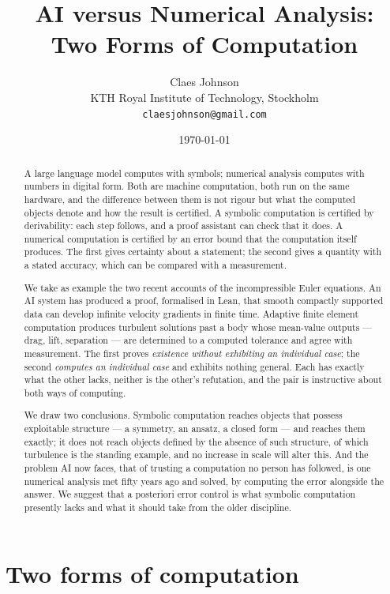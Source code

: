 \documentclass[11pt]{article}
\title{\vspace{-2em}AI versus Numerical Analysis:\\Two Forms of Computation}
\author{Claes Johnson\\[0.2em]
\small KTH Royal Institute of Technology, Stockholm\\
\small \texttt{claesjohnson@gmail.com}}
\date{\today}
\begin{document}
\maketitle

\begin{abstract}
\noindent
A large language model computes with symbols; numerical analysis computes with numbers in digital
form. Both are machine computation, both run on the same hardware, and the difference between them
is not rigour but what the computed objects denote and how the result is certified. A symbolic
computation is certified by derivability: each step follows, and a proof assistant can check that it
does. A numerical computation is certified by an error bound that the computation itself produces.
The first gives certainty about a statement; the second gives a quantity with a stated accuracy,
which can be compared with a measurement.

We take as example the two recent accounts of the incompressible Euler equations. An AI system has
produced a proof, formalised in Lean, that smooth compactly supported data can develop infinite
velocity gradients in finite time. Adaptive finite element computation produces turbulent solutions
past a body whose mean-value outputs --- drag, lift, separation --- are determined to a computed
tolerance and agree with measurement. The first proves \emph{existence without exhibiting an
individual case}; the second \emph{computes an individual case} and exhibits nothing general. Each
has exactly what the other lacks, neither is the other's refutation, and the pair is instructive
about both ways of computing.

We draw two conclusions. Symbolic computation reaches objects that possess exploitable structure ---
a symmetry, an ansatz, a closed form --- and reaches them exactly; it does not reach objects defined
by the absence of such structure, of which turbulence is the standing example, and no increase in
scale will alter this. And the problem AI now faces, that of trusting a computation no person has
followed, is one numerical analysis met fifty years ago and solved, by computing the error alongside
the answer. We suggest that a posteriori error control is what symbolic computation presently lacks
and what it should take from the older discipline.
\end{abstract}

\section{Two forms of computation}\label{sec:two}
\end{document}
